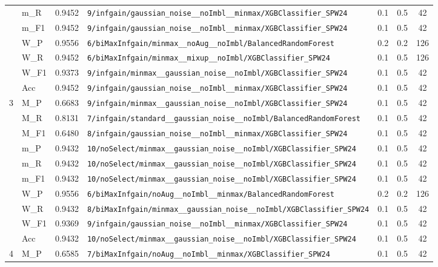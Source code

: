 \begin{table}[htbp]
\begin{tabular}{|c|l|c|>{\ttfamily\footnotesize}p{7.2cm}|c|c|c|}
 & m\_R & 0.9452 & \texttt{9/infgain/gaussian\_noise\_\_noImbl\_\_minmax/XGBClassifier\_SPW24} & 0.1 & 0.5  & 42 \\ 
 & m\_F1 & 0.9452 & \texttt{9/infgain/gaussian\_noise\_\_noImbl\_\_minmax/XGBClassifier\_SPW24} & 0.1 & 0.5  & 42 \\ 
 & W\_P & 0.9556 & \texttt{6/biMaxInfgain/minmax\_\_noAug\_\_noImbl/BalancedRandomForest} & 0.2 & 0.2  & 126 \\ 
 & W\_R & 0.9452 & \texttt{6/biMaxInfgain/minmax\_\_mixup\_\_noImbl/XGBClassifier\_SPW24} & 0.1 & 0.5  & 126 \\ 
 & W\_F1 & 0.9373 & \texttt{9/infgain/minmax\_\_gaussian\_noise\_\_noImbl/XGBClassifier\_SPW24} & 0.1 & 0.5  & 42 \\ 
 & Acc & 0.9452 & \texttt{9/infgain/gaussian\_noise\_\_noImbl\_\_minmax/XGBClassifier\_SPW24} & 0.1 & 0.5  & 42 \\ 
\hline
\multirow{10}{*}{3} & M\_P & 0.6683 & \texttt{9/infgain/minmax\_\_gaussian\_noise\_\_noImbl/XGBClassifier\_SPW24} & 0.1 & 0.5  & 42 \\ 
 & M\_R & 0.8131 & \texttt{7/infgain/standard\_\_gaussian\_noise\_\_noImbl/BalancedRandomForest} & 0.1 & 0.5  & 42 \\ 
 & M\_F1 & 0.6480 & \texttt{8/infgain/gaussian\_noise\_\_noImbl\_\_minmax/XGBClassifier\_SPW24} & 0.1 & 0.5  & 42 \\ 
 & m\_P & 0.9432 & \texttt{10/noSelect/minmax\_\_gaussian\_noise\_\_noImbl/XGBClassifier\_SPW24} & 0.1 & 0.5  & 42 \\ 
 & m\_R & 0.9432 & \texttt{10/noSelect/minmax\_\_gaussian\_noise\_\_noImbl/XGBClassifier\_SPW24} & 0.1 & 0.5  & 42 \\ 
 & m\_F1 & 0.9432 & \texttt{10/noSelect/minmax\_\_gaussian\_noise\_\_noImbl/XGBClassifier\_SPW24} & 0.1 & 0.5  & 42 \\ 
 & W\_P & 0.9556 & \texttt{6/biMaxInfgain/noAug\_\_noImbl\_\_minmax/BalancedRandomForest} & 0.2 & 0.2  & 126 \\ 
 & W\_R & 0.9432 & \texttt{8/biMaxInfgain/minmax\_\_gaussian\_noise\_\_noImbl/XGBClassifier\_SPW24} & 0.1 & 0.5  & 42 \\ 
 & W\_F1 & 0.9369 & \texttt{9/infgain/gaussian\_noise\_\_noImbl\_\_minmax/XGBClassifier\_SPW24} & 0.1 & 0.5  & 42 \\ 
 & Acc & 0.9432 & \texttt{10/noSelect/minmax\_\_gaussian\_noise\_\_noImbl/XGBClassifier\_SPW24} & 0.1 & 0.5  & 42 \\ 
\hline
\multirow{10}{*}{4} & M\_P & 0.6585 & \texttt{7/biMaxInfgain/noAug\_\_noImbl\_\_minmax/XGBClassifier\_SPW24} & 0.1 & 0.5  & 42 \\ 

\end{tabular}
\end{table}
